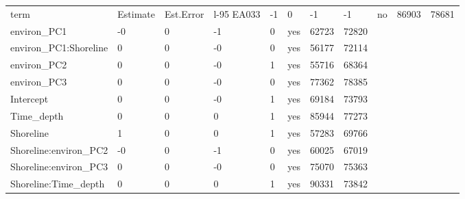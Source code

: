 \begin{tabular}{p{3cm}p{3cm}p{3cm}p{3cm}p{3cm}p{3cm}p{3cm}p{3cm}}
  \toprule
term & Estimate & Est.Error & l-95%
  \midrule
EA033 & -1 & 0 & -1 & -1 & no & 86903 & 78681 \\ 
  environ\_PC1 & -0 & 0 & -1 & 0 & yes & 62723 & 72820 \\ 
  environ\_PC1:Shoreline & 0 & 0 & -0 & 0 & yes & 56177 & 72114 \\ 
  environ\_PC2 & 0 & 0 & -0 & 1 & yes & 55716 & 68364 \\ 
  environ\_PC3 & 0 & 0 & -0 & 0 & yes & 77362 & 78385 \\ 
  Intercept & 0 & 0 & -0 & 1 & yes & 69184 & 73793 \\ 
  Time\_depth & 0 & 0 & 0 & 1 & yes & 85944 & 77273 \\ 
  Shoreline & 1 & 0 & 0 & 1 & yes & 57283 & 69766 \\ 
  Shoreline:environ\_PC2 & -0 & 0 & -1 & 0 & yes & 60025 & 67019 \\ 
  Shoreline:environ\_PC3 & 0 & 0 & -0 & 0 & yes & 75070 & 75363 \\ 
  Shoreline:Time\_depth & 0 & 0 & 0 & 1 & yes & 90331 & 73842 \\ 
   \bottomrule
\end{tabular}
